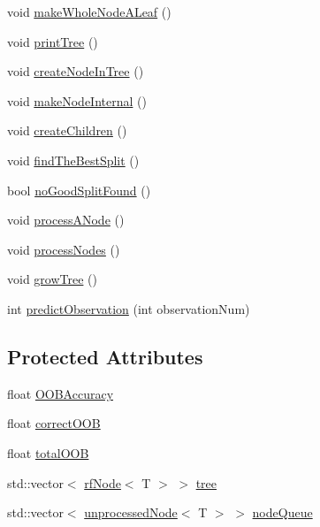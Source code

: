 \begin{DoxyCompactItemize}
\item 
void \hyperlink{classfp_1_1rfTree_a2b2a47186c0784415609f1c9b005e702}{make\+Whole\+Node\+A\+Leaf} ()
\item 
void \hyperlink{classfp_1_1rfTree_a89d982d5df6e068079d2fff5f6c15f58}{print\+Tree} ()
\item 
void \hyperlink{classfp_1_1rfTree_aaf9d8cdfbb1d10da53a375ea8204e393}{create\+Node\+In\+Tree} ()
\item 
void \hyperlink{classfp_1_1rfTree_aaf7bbdde5f7313c3e84853bbf5fdf792}{make\+Node\+Internal} ()
\item 
void \hyperlink{classfp_1_1rfTree_ad226037e7f93c0fa2a1a960e19a87bed}{create\+Children} ()
\item 
void \hyperlink{classfp_1_1rfTree_a51da8e4a46582b26643a4ae392230e77}{find\+The\+Best\+Split} ()
\item 
bool \hyperlink{classfp_1_1rfTree_a618bdc2d22267b4bb4f5e1881b1788f6}{no\+Good\+Split\+Found} ()
\item 
void \hyperlink{classfp_1_1rfTree_ab7760333f6857ab7ce2ee29a7bc16e65}{process\+A\+Node} ()
\item 
void \hyperlink{classfp_1_1rfTree_a7997df3477bc9f73163384c8cd0bcec9}{process\+Nodes} ()
\item 
void \hyperlink{classfp_1_1rfTree_a196d6006e7e2ee0575fa40d7d4621712}{grow\+Tree} ()
\item 
int \hyperlink{classfp_1_1rfTree_aad66c44e2062c163b1560f9bf1bd759f}{predict\+Observation} (int observation\+Num)
\end{DoxyCompactItemize}
\subsection*{Protected Attributes}
\begin{DoxyCompactItemize}
\item 
float \hyperlink{classfp_1_1rfTree_a673f85d4df6f292a1819351c092a07e1}{O\+O\+B\+Accuracy}
\item 
float \hyperlink{classfp_1_1rfTree_a83832650bcea8d63cdcd480d9ddc6e6e}{correct\+O\+OB}
\item 
float \hyperlink{classfp_1_1rfTree_aa200dc228adc20c12e514364d2b674df}{total\+O\+OB}
\item 
std\+::vector$<$ \hyperlink{classrfNode}{rf\+Node}$<$ T $>$ $>$ \hyperlink{classfp_1_1rfTree_a1d5c209715f4044a85878c17e2b3ee53}{tree}
\item 
std\+::vector$<$ \hyperlink{classfp_1_1unprocessedNode}{unprocessed\+Node}$<$ T $>$ $>$ \hyperlink{classfp_1_1rfTree_af72d0a2f930fd480dfb4858885c2df23}{node\+Queue}
\end{DoxyCompactItemize}


